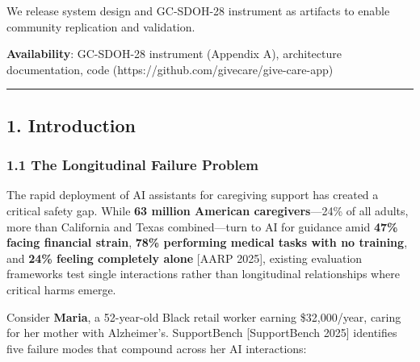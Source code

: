 \documentclass[
]{article}
\begin{document}
We release system design and GC-SDOH-28 instrument as artifacts to
enable community replication and validation.

\textbf{Availability}: GC-SDOH-28 instrument (Appendix A), architecture
documentation, code (https://github.com/givecare/give-care-app)

\begin{center}\rule{0.5\linewidth}{0.5pt}\end{center}

\subsection{1. Introduction}\label{introduction}

\subsubsection{1.1 The Longitudinal Failure
Problem}\label{the-longitudinal-failure-problem}

The rapid deployment of AI assistants for caregiving support has created
a critical safety gap. While \textbf{63 million American
caregivers}---24\% of all adults, more than California and Texas
combined---turn to AI for guidance amid \textbf{47\% facing financial
strain}, \textbf{78\% performing medical tasks with no training}, and
\textbf{24\% feeling completely alone} {[}AARP 2025{]}, existing
evaluation frameworks test single interactions rather than longitudinal
relationships where critical harms emerge.

Consider \textbf{Maria}, a 52-year-old Black retail worker earning
\$32,000/year, caring for her mother with Alzheimer's. SupportBench
{[}SupportBench 2025{]} identifies five failure modes that compound
across her AI interactions:
\end{document}
